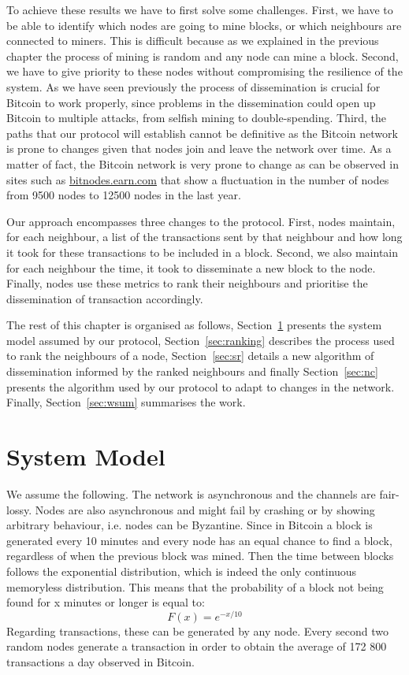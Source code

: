 To achieve these results we have to first solve some challenges. First, we have to be able to identify which nodes are going to mine blocks, or which neighbours are connected to miners. This is difficult because as we explained in the previous chapter the process of mining is random and any node can mine a block. 
Second, we have to give priority to these nodes without compromising the resilience of the system. As we have seen previously the process of dissemination is crucial for Bitcoin to work properly, since problems in the dissemination could open up Bitcoin to multiple attacks, from selfish mining to double-spending.
Third, the paths that our protocol will establish cannot be definitive as the Bitcoin network is prone to changes given that nodes join and leave the network over time. As a matter of fact, the Bitcoin network is very prone to change as can be observed in sites such as \url{bitnodes.earn.com} that show a fluctuation in the number of nodes from 9500 nodes to 12500 nodes in the last year.

Our approach encompasses three changes to the protocol.
First, nodes  maintain, for each neighbour, a list of the transactions sent by that neighbour and how long it took for these transactions to be included in a block.
Second, we also maintain for each neighbour the time, it took to disseminate a new block to the node.
Finally, nodes use these metrics to rank their neighbours and prioritise the dissemination of transaction accordingly.

The rest of this chapter is organised as follows, Section~\ref{sec:sm} presents the system model assumed by our protocol, Section~\ref{sec:ranking} describes the process used to rank the neighbours of a node, Section~\ref{sec:sr} details a new algorithm of dissemination informed by the ranked neighbours and finally Section~\ref{sec:nc} presents the algorithm used by our protocol to adapt to changes in the network. Finally, Section~\ref{sec:wsum} summarises the work.


\section{System Model}
\label{sec:sm}
We assume the following. The network is asynchronous and the channels are fair-lossy. Nodes are also asynchronous and might fail by crashing or by showing arbitrary behaviour, i.e. nodes can be Byzantine.  
Since in Bitcoin a block is generated every 10 minutes and every node has an equal chance to find a block, regardless of when the previous block was mined. Then the time between blocks follows the exponential distribution, which is indeed the only continuous memoryless distribution. This means that the probability of a block not being found for x minutes or longer is equal to:
\begin{equation}
F(x) = e^{-x/10}    
\end{equation}
Regarding transactions, these can be generated by any node. Every second two random nodes generate a transaction in order to obtain the average of 172 800 transactions a day observed in Bitcoin.

